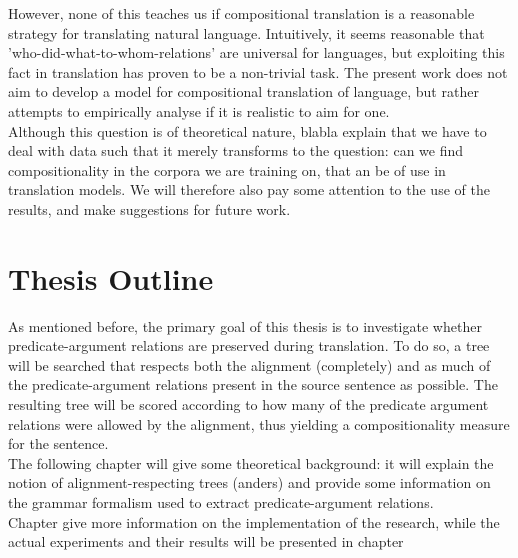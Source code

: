 \documentclass{report}
\theoremstyle{definition}
\theoremstyle{plain}
\begin{document}

However, none of this teaches us if compositional translation is a reasonable strategy for translating natural language. Intuitively, it seems reasonable that 'who-did-what-to-whom-relations' are universal for languages, but exploiting this fact in translation has proven to be a non-trivial task. The present work does not aim to develop a model for compositional translation of language, but rather attempts to empirically analyse if it is realistic to aim for one.\\
Although this question is of theoretical nature, blabla explain that we have to deal with data such that it merely transforms to the question: can we find compositionality in the corpora we are training on, that an be of use in translation models. We will therefore also pay some attention to the use of the results, and make suggestions for future work.


\section*{Thesis Outline}

As mentioned before, the primary goal of this thesis is to investigate whether predicate-argument relations are preserved during translation. To do so, a tree will be searched that respects both the alignment (completely) and as much of the predicate-argument relations present in the source sentence as possible. The resulting tree will be scored according to how many of the predicate argument relations were allowed by the alignment, thus yielding a compositionality measure for the sentence.\\
The following chapter will give some theoretical background: it will explain the notion of alignment-respecting trees (anders) and provide some information on the grammar formalism used to extract predicate-argument relations.\\
Chapter give more information on the implementation of the research, while the actual experiments and their results will be presented in chapter 
\end{document}
